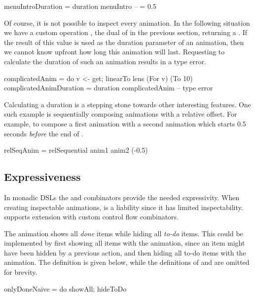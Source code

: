 \begin{spec}
menuIntroDuration = duration menuIntro -- = 0.5
\end{spec}

Of course, it is not possible to inspect every animation. In the following situation we have a custom operation , the dual of  in the previous section, returning a . If the result of this value is used as the duration parameter of an animation, then we cannot know upfront how long this animation will last. Requesting to calculate the duration of such an animation results in a type error.

\begin{spec}
complicatedAnim = do v <- get; linearTo lens (For v) (To 10)
complicatedAnimDuration = duration complicatedAnim -- type error
\end{spec}

Calculating a duration is a stepping stone towards other interesting features. One such example is sequentially composing animations with a relative offset. For example, to compose a first animation  with a second animation  which starts 0.5 seconds \emph{before} the end of .

\begin{spec}
relSeqAnim = relSequential anim1 anim2 (-0.5)
\end{spec}

\subsection{Expressiveness}
\label{sec:customcomb}

In monadic DSLs the \hs{>>=} and  combinators provide the needed expressivity. When creating inspectable animations, \hs{>>=} is a liability since it has limited inspectability. \dsl{} supports extension with custom control flow combinators.

The  animation shows all \emph{done} items while
hiding all \emph{to-do} items. This could be implemented by first
showing all items with the  animation, since an item might have
been hidden by a previous action, and then hiding all to-do items with the
 animation. The definition is given below, while the definitions
of  and  are omitted for brevity.

\begin{spec}
onlyDoneNaive = do showAll; hideToDo
\end{spec}

